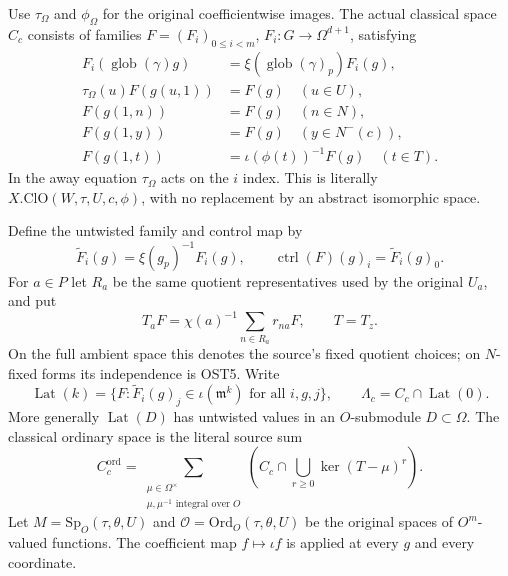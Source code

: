 \documentclass[11pt,a4paper]{article}
\numberwithin{equation}{section}
\theoremstyle{remark}\newtheorem{remark}[theorem]{Remark}
\begin{document}
Use $\tau_\Omega$ and $\phi_\Omega$ for the original coefficientwise
images.  The actual classical space $C_c$ consists of families
$F=(F_i)_{0\leq i<m}$, $F_i:G\to\Omega^{d+1}$, satisfying
\begin{align}
 F_i(\operatorname{glob}(\gamma)g)
      &=\xi(\operatorname{glob}(\gamma)_p)F_i(g),\\
 \tau_\Omega(u)F(g(u,1))&=F(g)\quad(u\in U),\\
 F(g(1,\allowbreak{} n))&=F(g)\quad(n\in N),\\
 F(g(1,\allowbreak{} y))&=F(g)\quad(y\in N^-(c)),\\
 F(g(1,\allowbreak{} t))&=\iota(\phi(t))^{-1}F(g)\quad(t\in T).
 \label{eq:oct-classical}
\end{align}
In the away equation $\tau_\Omega$ acts on the $i$ index.  This is
literally $X.\mathrm{ClO}(W,\tau,\allowbreak{} U,\allowbreak{} c,\phi)$, with no replacement by
an abstract isomorphic space.

Define the untwisted family and control map by
\begin{equation}\label{eq:oct-control}
 \widetilde F_i(g)=\xi(g_p)^{-1}F_i(g),\qquad
 \operatorname{ctrl}(F)(g)_i=\widetilde F_i(g)_0.
\end{equation}
For $a\in P$ let $R_a$ be the same quotient representatives used by
the original $U_a$, and put
\begin{equation}\label{eq:oct-T}
 T_aF=\chi(a)^{-1}\sum_{n\in R_a}r_{na}F,
       \qquad T=T_z.
\end{equation}
On the full ambient space this denotes the source's fixed quotient
choices; on $N$-fixed forms its independence is OST5.  Write
\[
 \operatorname{Lat}(k)=
 \{F:\widetilde F_i(g)_j\in\iota(\mathfrak m^k)
                  \text{ for all }i,\allowbreak{} g,\allowbreak{} j\},\qquad
 \Lambda_c=C_c\cap\operatorname{Lat}(0).
\]
More generally $\operatorname{Lat}(D)$ has untwisted values in an
$O$-submodule $D\subset\Omega$.  The classical ordinary space is
the literal source sum
\begin{equation}\label{eq:oct-clord}
 C_c^{\mathrm{ord}}=
 \sum_{\substack{\mu\in\Omega^\times\\
                  \mu,\mu^{-1}\text{ integral over }O}}
           \left(C_c\cap\bigcup_{r\geq0}\ker(T-\mu)^r\right).
\end{equation}
Let $M=\mathrm{Sp}_O(\tau,\theta,\allowbreak{} U)$ and
$\mathcal O=\mathrm{Ord}_O(\tau,\theta,\allowbreak{} U)$ be the original spaces
of $O^m$-valued functions.  The coefficient map $f\mapsto\iota f$
is applied at every $g$ and every coordinate.
\end{document}
